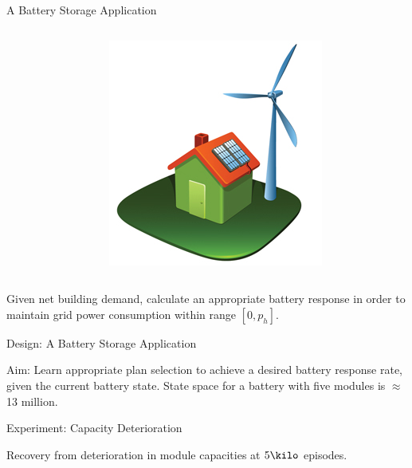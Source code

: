\documentclass[10pt]{beamer}
\renewcommand\example[1]{{\color{black!50!green}#1}}
\begin{document}
\begin{frame}{A Battery Storage Application}
\begin{columns}
\begin{column}[l]{0.6\textwidth}

\end{column}
\begin{column}[r]{0.3\textwidth}
\begin{center}\includegraphics[scale=0.4]{figs/fig-storage-building}\end{center}
\end{column}
\end{columns}
Given net building demand, \alert{calculate an appropriate battery response} in order to maintain grid power consumption within range $[0,p_h]$.
\end{frame}

\begin{frame}{Design: A Battery Storage Application}
\begin{center}
\resizebox{0.8\textwidth}{!}{

}
\end{center}
Aim: Learn appropriate plan selection to achieve a desired \alert{battery response rate}, given the current battery state. \example{State space for a battery with five modules is $\approx$13 million.}
\end{frame}

\begin{frame}[allowframebreaks]{Experiment: Capacity Deterioration}

\begin{center}


Recovery from \alert{deterioration in module capacities} at $5\kilo$ episodes.
\end{center}
\end{frame}
\end{document}
